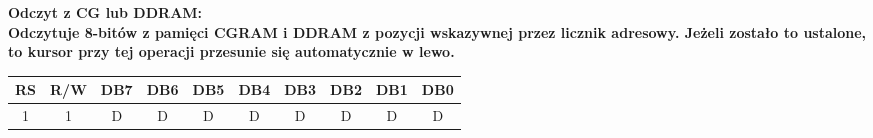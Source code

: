 \documentclass[a4paper,12pt]{article}
\newcommand{\h}[1]{\noindent \bf #1 \rm \\ \noindent}
\begin{document}
\h{Odczyt z CG lub DDRAM:}
Odczytuje 8-bitów z pamięci CGRAM i DDRAM z pozycji wskazywnej przez licznik adresowy. Jeżeli zostało to ustalone, to kursor przy tej operacji przesunie się automatycznie w lewo.
\begin{table}[H]
	\centering
	\begin{tabular}{|c|c|c|c|c|c|c|c|c|c|}
		\hline
		\textbf{RS} & \textbf{R/W} & \textbf{DB7} & \textbf{DB6} & \textbf{DB5} & \textbf{DB4} & \textbf{DB3} & \textbf{DB2} & \textbf{DB1} & \textbf{DB0} \\ \hline
		1           & 1            & D            & D            & D            & D            & D            & D            & D            & D            \\ \hline
	\end{tabular}
\end{table}
\end{document}
